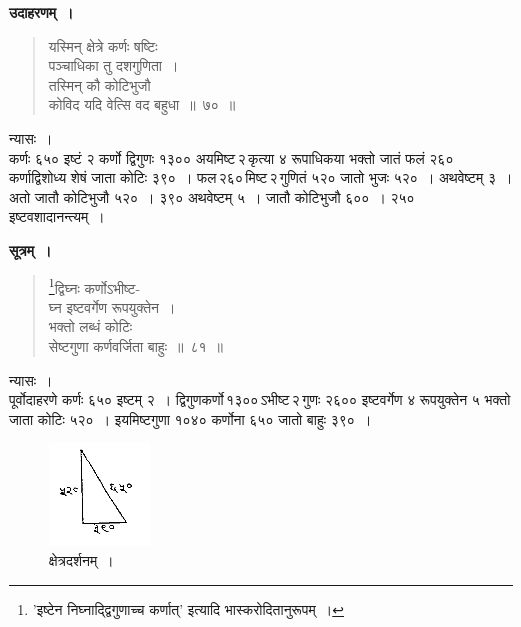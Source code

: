 \documentclass[11pt, openany]{book}
\begin{document}
 \textbf{उदाहरणम्~।} 
\begin{quote}
    \bqt 
यस्मिन् क्षेत्रे कर्णः षष्टिः \\
पञ्चाधिका तु दशगुणिता~।\\
तस्मिन् कौ कोटिभुजौ \\
कोविद यदि वेत्सि वद बहुधा~॥~७०~॥
\end{quote}

न्यासः~। \\

\vspace{-4mm}
 कर्णः ६५० इष्टं २ कर्णो द्विगुणः १३०० अयमिष्ट\textendash \,२\textendash \,कृत्या ४ रूपाधिकया भक्तो जातं फलं २६० कर्णाद्विशोध्य शेषं जाता कोटिः ३९०~। फल\textendash \,२६०\textendash \,मिष्ट\textendash \,२\textendash \,गुणितं ५२० जातो भुजः ५२०~। अथवेष्टम् ३~। अतो जातौ कोटिभुजौ ५२०~। ३९० अथवेष्टम् ५~। जातौ कोटिभुजौ ६००~। २५० इष्टवशादानन्त्यम्~। 
\newpage%

\setcounter{footnote}{0}
 \textbf{सूत्रम्~।} 
  \label{4.81}
\begin{quote}
    \bs 
    \footnote{'{\color{violet}इष्टेन निघ्नाद्द्विगुणाच्च कर्णात्}' इत्यादि {\color{violet}भास्करो}दितानुरूपम्~।}द्विघ्नः कर्णोऽभीष्ट-\\
    घ्न इष्टवर्गेण रूपयुक्तेन~।\\
भक्तो लब्धं कोटिः \\
सेष्टगुणा कर्णवर्जिता बाहुः~॥~८१~॥
\end{quote}
 
न्यासः~। \\

\vspace{-4mm}
 पूर्वोदाहरणे कर्णः ६५० इष्टम् २~। द्विगुणकर्णो\textendash \,१३००\textendash \,ऽभीष्ट\textendash \,२\textendash \,गुणः २६०० इष्टवर्गेण ४ रूपयुक्तेन ५ भक्तो जाता कोटिः ५२०~। इयमिष्टगुणा १०४०
कर्णोना ६५० जातो बाहुः ३९०~। 

\begin{figure}[h!]
    \centering
    \captionsetup{labelformat=empty} 
    \caption{क्षेत्रदर्शनम्~।}
\vspace{-2mm}
    \includegraphics[scale=0.85]{graphics/capture101.png}
\end{figure}
\vspace{-2mm}
\end{document}
